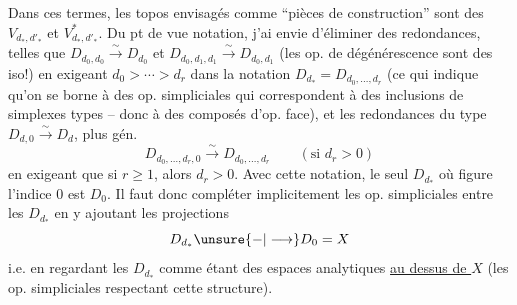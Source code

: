Dans ces termes, les topos envisagés comme ``pièces de construction'' sont des $V_{d_*,d'_*}$ et $V^*_{d_*,d'_*}$.
Du pt de vue notation, j'ai envie d'éliminer des redondances, telles que $D_{d_0,d_0}\xrightarrow{\sim}D_{d_0}$ et $D_{d_0,d_1,d_1}\xrightarrow{\sim}D_{d_0,d_1}$ (les op.  de dégénérescence sont des iso!) en exigeant $d_0>\cdots>d_r$ dans la notation $D_{d_*}=D_{d_0,\ldots,d_r}$ (ce qui indique qu'on se borne à des op. simpliciales qui correspondent à des inclusions de simplexes types -- donc à des composés d'op. face),  et les redondances du type $D_{d,0}\xrightarrow{\sim}D_d$, plus gén.
\[
D_{d_0,\ldots,d_r,0}\xrightarrow{\sim}D_{d_0,\ldots,d_r}\qquad(\text{si }d_r>0)
\]
en exigeant que si $r\geq1$, alors $d_r>0$. Avec cette notation, le seul $D_{d_*}$ où figure l'indice $0$ est $D_0$. Il faut donc compléter implicitement les op. simpliciales entre les $D_{d_*}$ en y ajoutant les projections
\[
D_{d_*}\unsure{-|\longrightarrow}D_0=X
\]
i.e. en regardant les $D_{d_*}$ comme étant des espaces analytiques \uline{au dessus de $X$} (les op. simpliciales respectant cette structure).

